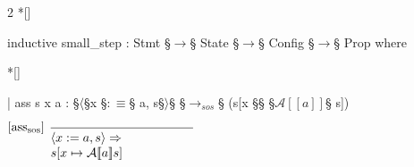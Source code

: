 \begin{paracol}{2}
\switchcolumn[1]*[]
\begin{leftcolumn}
    \begin{Lean_Code}
inductive small_step :
  Stmt §\(\to\)§ State §\(\to\)§
  Config §\(\to\)§ Prop where
    \end{Lean_Code}
\end{leftcolumn}
\begin{rightcolumn}
\end{rightcolumn}
\vspace{2em}


\switchcolumn[1]*[]
\begin{leftcolumn}
    \begin{Lean_Code}
  | ass {s x a} :
    §\(\langle\)§x §\(: \equiv\)§ a, s§\(\rangle\)§ §\(\to_{sos}\)§
      (s[x §\mapsto§ §\(\mathcal{A}[\![a]\!]\)§ s])
    \end{Lean_Code}
\end{leftcolumn}
\begin{rightcolumn}
\vspace{1.1em}
    \(
\begin{prooftree}
  \hypo{} %
  \infer[
    left label=[ass$_{\text{sos}}$]
    ]1{
        \parbox{4cm}{$
    \langle x := a, s \rangle \Rightarrow \\
    s[x \mapsto \mathcal{A}[\![a]\!] s]
        $}
    }
\end{prooftree}
    \)
\end{rightcolumn}
\vspace{1em}



\end{paracol}
